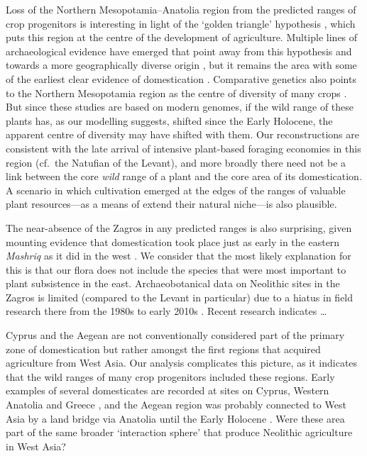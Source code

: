 \documentclass[
  authoryear,
  preprint]{elsarticle}
\begin{document}
Loss of the Northern Mesopotamia--Anatolia region from the predicted
ranges of crop progenitors is interesting in light of the `golden
triangle' hypothesis
\citep{Lev-YadunEtAl2000, KozlowskiAurenche2005, AbboEtAl2010}, which
puts this region at the centre of the development of agriculture.
Multiple lines of archaeological evidence have emerged that point away
from this hypothesis and towards a more geographically diverse origin
\citep{Asouti2006, cites}, but it remains the area with some of the
earliest clear evidence of domestication
\citep{ZoharyHopfWeiss2012, KabukcuEtAl2021, UlasEtAl2024}. Comparative
genetics also points to the Northern Mesopotamia region as the centre of
diversity of many crops \citep[e.g.][]{HaasEtAl2019}. But since these
studies are based on modern genomes, if the wild range of these plants
has, as our modelling suggests, shifted since the Early Holocene, the
apparent centre of diversity may have shifted with them. Our
reconstructions are consistent with the late arrival of intensive
plant-based foraging economies in this region (cf.~the Natufian of the
Levant), and more broadly there need not be a link between the core
\emph{wild} range of a plant and the core area of its domestication. A
scenario in which cultivation emerged at the edges of the ranges of
valuable plant resources---as a means of extend their natural niche---is
also plausible.

The near-absence of the Zagros in any predicted ranges is also
surprising, given mounting evidence that domestication took place just
as early in the eastern \emph{Mashriq} as it did in the west
\citep{Braidwood, GanjDarehGoats, HillyFlanksStuff}. We consider that
the most likely explanation for this is that our flora does not include
the species that were most important to plant subsistence in the east.
Archaeobotanical data on Neolithic sites in the Zagros is limited
(compared to the Levant in particular) due to a hiatus in field research
there from the 1980s to early 2010s \citep{cite}. Recent research
\citep{Amaia} indicates \ldots{}

Cyprus and the Aegean are not conventionally considered part of the
primary zone of domestication but rather amongst the first regions that
acquired agriculture from West Asia. Our analysis complicates this
picture, as it indicates that the wild ranges of many crop progenitors
included these regions. Early examples of several domesticates are
recorded at sites on Cyprus, Western Anatolia and Greece
\citep{ArranzOtaeguiRoe2023}, and the Aegean region was probably
connected to West Asia by a land bridge via Anatolia until the Early
Holocene \citep{AksuHiscott2022}. Were these area part of the same
broader `interaction sphere' \citep{cite} that produce Neolithic
agriculture in West Asia?
\end{document}
